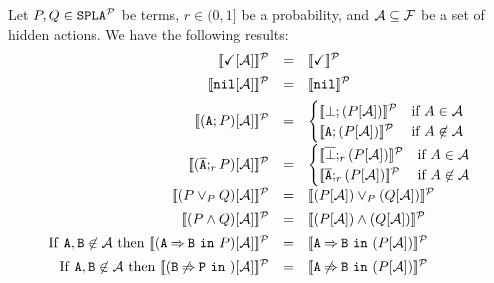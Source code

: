 \bprop
  Let $P,Q\in\mathtt{SPLA{^{\cal P}}}$ be terms, $r\in (0,1]$ be a probability, and
  ${\cal A}\subseteq{\cal F}$ be a set of hidden actions. We have the following results:
  $$\begin{array}{rll}
  \semdenp{\checkmark\hide\calA}&=&\semdenp{\checkmark}\\[0.5em]
  \semdenp{\nil\hide\calA}&=&\semdenp{\nil}\\[0.5em]
  \semdenp{(\fA;P)\hide\calA}&=&
      \begin{cases}
        \semdenp{\bot;(P\hide\calA)} & \mbox{if } A\in\calA\\
        \semdenp{\fA;(P\hide\calA)} & \mbox{if } A\not\in\calA\\
      \end{cases}\\[1em]
  \semdenp{(\ofA;_rP)\hide\calA}&=&
      \begin{cases}
        \semdenp{\overline{\bot};_r(P\hide\calA)} & \mbox{if } A\in\calA\\
        \semdenp{\ofA;_r(P\hide\calA)} & \mbox{if } A\not\in\calA\\
      \end{cases}\\[1em]
  \semdenp{(P\choice_P Q)\hide\calA}&=&\semdenp{(P\hide\calA)\choice_P (Q\hide\calA)}\\[0.5em]
  \semdenp{(P\paral Q)\hide\calA}&=&\semdenp{(P\hide\calA)\paral (Q\hide\calA)}\\[0.5em]
  \mathrm{If\ } \fA,\fB\not\in\calA \mathrm{\ then\ }
    \semdenp{(\require{A}{B}{P})\hide\calA}&=&\semdenp{\require{A}{B}{(P\hide\calA)}}\\[0.5em]
  \mathrm{If\ } \fA,\fB\not\in\calA \mathrm{\ then\ }
    \semdenp{(\exclude{B}{P})\hide\calA}&=&\semdenp{\exclude{A}{B}{(P\hide\calA)}}
  \end{array}$$
\eprop


